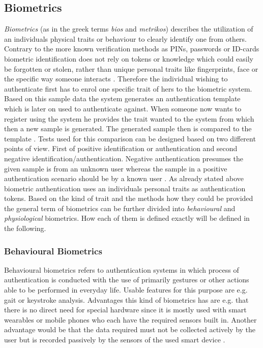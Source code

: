 \subsection{Biometrics}
\textit{Biometrics} (as in the greek terms \textit{bios} and \textit{metrikos}) describes the utilization of an individuals physical traits or behaviour to clearly identify one from others. Contrary to the more known verification methods as PINs, passwords or ID-cards biometric identification does not rely on tokens or knowledge which could easily be forgotten or stolen, rather than unique personal traits like fingerprints, face or the specific way someone interacts \cite[chpt. 1.1]{jain2007handbook}\cite{delac2004survey}. Therefore the individual wishing to authenticate first has to enrol one specific trait of hers to the biometric system. Based on this sample data the system generates an authentication template which is later on used to authenticate against.\newline \newline 
When someone now wants to register using the system he provides the trait wanted to the system from which then a new sample is generated. The generated sample then is compared to the template \cite{alsaadi2015physiological}.\newline
Tests used for this comparison can be designed based on two different points of view. First of positive identification or authentication and second negative identification/authentication. Negative authentication presumes the given sample is from an unknown user whereas the sample in a positive authentication scenario should be by a known user \cite{wayman2005introduction}.
As already stated above biometric authentication uses an individuals personal traits as authentication tokens. Based on the kind of trait and the methods how they could be provided the general term of biometrics can be further divided into \textit{behavioural} and \textit{physiological} biometrics. How each of them is defined exactly will be defined in the following.
\subsubsection{Behavioural Biometrics} Behavioural biometrics refers to authentication systems in which process of authentication is conducted with the use of primarily gestures or other actions able to be performed in everyday life. Usable features for this purpose are e.g. gait or keystroke analysis. Advantages this kind of biometrics has are e.g. that there is no direct need for special hardware since it is mostly used with smart wearables or mobile phones who each have the required sensors built in. Another advantage would be that the data required must not be collected actively by the user but is recorded passively by the sensors of the used smart device \cite{yampolskiy2008behavioural}.
